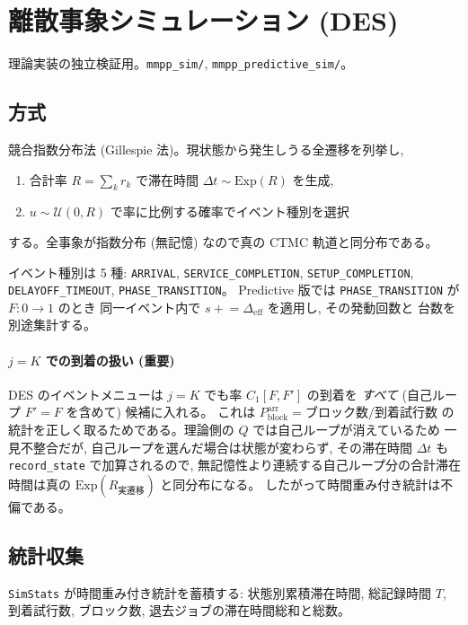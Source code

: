 \documentclass[a4paper,11pt]{article}
\newcommand{\code}[1]{\texttt{#1}}
\newcommand{\eff}{\mathrm{eff}}
\newcommand{\blk}{\mathrm{block}}
\begin{document}
\section{離散事象シミュレーション (DES)}
\label{sec:des}

理論実装の独立検証用。\code{mmpp\_sim/}, \code{mmpp\_predictive\_sim/}。

\subsection{方式}

競合指数分布法 (Gillespie 法)。現状態から発生しうる全遷移を列挙し,
\begin{enumerate}
  \item 合計率 $R=\sum_k r_k$ で滞在時間 $\Delta t\sim\mathrm{Exp}(R)$ を生成,
  \item $u\sim\mathcal{U}(0,R)$ で率に比例する確率でイベント種別を選択
\end{enumerate}
する。全事象が指数分布 (無記憶) なので真の CTMC 軌道と同分布である。

イベント種別は 5 種: \code{ARRIVAL}, \code{SERVICE\_COMPLETION},
\code{SETUP\_COMPLETION}, \code{DELAYOFF\_TIMEOUT}, \code{PHASE\_TRANSITION}。
Predictive 版では \code{PHASE\_TRANSITION} が $F:0\to1$ のとき
同一イベント内で $s\mathrel{+}=\Delta_{\eff}$ を適用し, その発動回数と
台数を別途集計する。

\paragraph{$j=K$ での到着の扱い (重要)}
DES のイベントメニューは $j=K$ でも率 $C_1[F,F']$ の到着を
\emph{すべて} (自己ループ $F'=F$ を含めて) 候補に入れる。
これは $P_\blk^{\mathrm{arr}}=\text{ブロック数}/\text{到着試行数}$ の
統計を正しく取るためである。理論側の $Q$ では自己ループが消えているため
一見不整合だが, 自己ループを選んだ場合は状態が変わらず,
その滞在時間 $\Delta t$ も \code{record\_state} で加算されるので,
無記憶性より連続する自己ループ分の合計滞在時間は真の
$\mathrm{Exp}(R_{\text{実遷移}})$ と同分布になる。
したがって時間重み付き統計は不偏である。

\subsection{統計収集}

\code{SimStats} が時間重み付き統計を蓄積する: 状態別累積滞在時間,
総記録時間 $T$, 到着試行数, ブロック数, 退去ジョブの滞在時間総和と総数。
\end{document}
